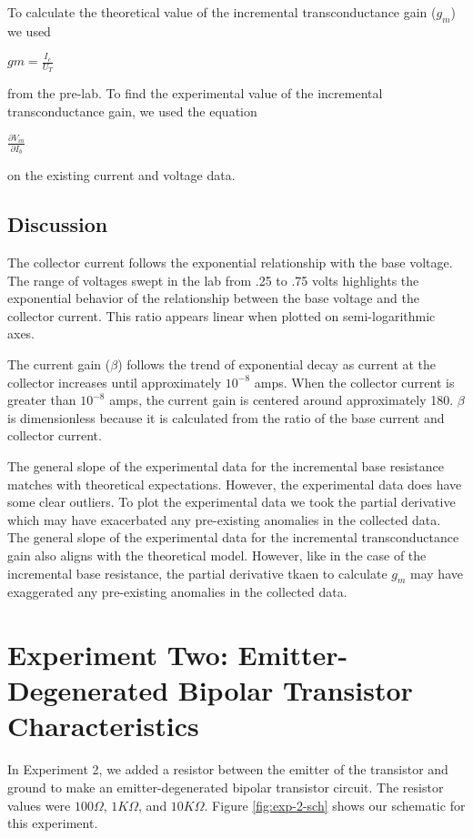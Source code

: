 \documentclass{article}
\begin{document}
To calculate the theoretical value of the incremental transconductance gain ($g_m$) we used 
\begin{center}
    $gm = \frac{I_{c}}{U_{T}}$
\end{center}
from the pre-lab. To find the experimental value of the incremental transconductance gain, we used the equation
\begin{center}
    $\frac{\partial V_{in}}{\partial I_{b}}$ 
\end{center}
on the existing current and voltage data.


\subsection{Discussion}
The collector current follows the exponential relationship with the base voltage.  The range of voltages swept in the lab from .25 to .75 volts highlights the exponential behavior of the relationship between the base voltage and the collector current. This ratio appears linear when plotted on semi-logarithmic axes.

The current gain ($\beta$) follows the trend of exponential decay as current at the collector increases until approximately $10^{-8}$ amps.  When the collector current is greater than $10^{-8}$ amps, the current gain is centered around approximately 180.  $\beta$ is dimensionless because it is  calculated from the ratio of the base current and collector current.

The general slope of the experimental data for the incremental base resistance matches with theoretical expectations.  However, the experimental data does have some clear outliers. To plot the experimental data we took the partial derivative which may have exacerbated any pre-existing anomalies in the collected data.  The general slope of the experimental data for the incremental transconductance gain also aligns with the theoretical model.  However, like in the case of the incremental base resistance, the partial derivative tkaen to calculate $g_{m}$ may have exaggerated any pre-existing anomalies in the collected data.

\section{Experiment Two: Emitter-Degenerated Bipolar Transistor Characteristics}

In Experiment 2, we added a resistor between the emitter of the transistor and ground to make an emitter-degenerated bipolar transistor circuit. The resistor values were $100 \Omega$, $1K \Omega$,  and $10K \Omega$. Figure \ref{fig:exp-2-sch} shows our schematic for this experiment.
\end{document}
